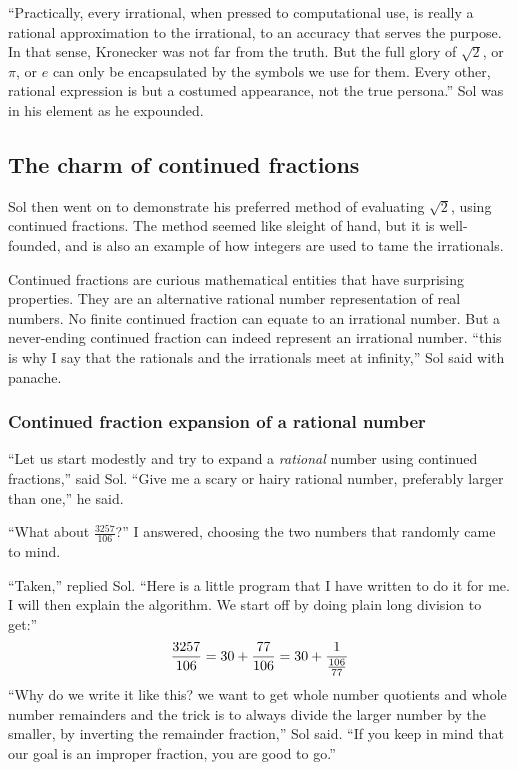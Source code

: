\documentclass[
  a4paper,
]{article}
\begin{document}
``Practically, every irrational, when pressed to computational use, is
really a rational approximation to the irrational, to an accuracy that
serves the purpose. In that sense, Kronecker was not far from the truth.
But the full glory of \(\sqrt{2}\), or \(\pi\), or \(e\) can only be
encapsulated by the symbols we use for them. Every other, rational
expression is but a costumed appearance, not the true persona.'' Sol was
in his element as he expounded.

\subsection{The charm of continued
fractions}\label{the-charm-of-continued-fractions}

Sol then went on to demonstrate his preferred method of evaluating
\(\sqrt{2}\), using continued fractions. The method seemed like sleight
of hand, but it is well-founded, and is also an example of how integers
are used to tame the irrationals.

Continued fractions are curious mathematical entities that have
surprising properties. They are an alternative rational number
representation of real numbers. No finite continued fraction can equate
to an irrational number. But a never-ending continued fraction can
indeed represent an irrational number. ``this is why I say that the
rationals and the irrationals meet at infinity,'' Sol said with panache.

\subsubsection{Continued fraction expansion of a rational
number}\label{continued-fraction-expansion-of-a-rational-number}

``Let us start modestly and try to expand a \emph{rational} number using
continued fractions,'' said Sol. ``Give me a scary or hairy rational
number, preferably larger than one,'' he said.

``What about \(\frac{3257}{106}\)?'' I answered, choosing the two
numbers that randomly came to mind.

``Taken,'' replied Sol. ``Here is a little program that I have written
to do it for me. I will then explain the algorithm. We start off by
doing plain long division to get:'' \[
\frac{3257}{106} = 30 + \frac{77}{106} = 30 + \frac{1}{\frac{106}{77}}\\
\] ``Why do we write it like this? we want to get whole number quotients
and whole number remainders and the trick is to always divide the larger
number by the smaller, by inverting the remainder fraction,'' Sol said.
``If you keep in mind that our goal is an improper fraction, you are
good to go.''
\end{document}
